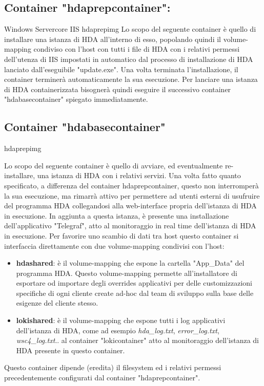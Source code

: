 \subsection{Container "hdaprepcontainer":}

\begin{namespacedesc}
	 {Windows Servercore IIS}
	 {hdaprepimg}
	 {Lo scopo del seguente container è quello di installare una istanza di HDA all'interno di esso, popolando quindi il volume-mapping condiviso con l'host con tutti i file di HDA con i relativi permessi dell'utenza di IIS impostati in automatico dal processo di installazione di HDA lanciato dall'eseguibile "update.exe".
Una volta terminata l'installazione, il container terminerà automaticamente la sua esecuzione. Per lanciare una istanza di HDA containerizzata bisognerà quindi eseguire il successivo container "hdabasecontainer" spiegato immediatamente.}
\end{namespacedesc}
\subsection{Container "hdabasecontainer"}

\begin{namespacedesc}
	 {hdaprepimg}
	 {Lo scopo del seguente container è quello di avviare, ed eventualmente re-installare, una istanza di HDA con i relativi servizi. Una volta fatto quanto specificato, a differenza del container hdaprepcontainer, questo non interromperà la sua esecuzione, ma rimarrà attivo per permettere ad utenti esterni di usufruire del programma HDA collegandosi alla web-interface propria dell'istanza di HDA in esecuzione. In aggiunta a questa istanza, è presente una installazione dell'applicativo "Telegraf", atto al monitoraggio in real time dell'istanza di HDA in esecuzione. 
Per favorire uno scambio di dati tra host questo container si interfaccia direttamente con due volume-mapping condivisi con l'host:
\begin{itemize}
	\item \textbf{hdashared}: è il volume-mapping che espone la cartella "App\_Data" del programma HDA. Questo volume-mapping permette all'installatore di esportare od importare degli overrides applicativi per delle customizzazioni specifiche di ogni cliente create ad-hoc dal team di sviluppo sulla base delle esigenze del cliente stesso.
	\item \textbf{lokishared}: è il volume-mapping che espone tutti i log applicativi dell'istanza di HDA, come ad esempio \textit{hda\_log.txt}, \textit{error\_log.txt}, \textit{wsc4\_log.txt}.. al container "lokicontainer" atto al monitoraggio dell'istanza di HDA presente in questo container.
\end{itemize}
Questo container dipende (eredita) il filesystem  ed i relativi permessi precedentemente configurati dal container "hdaprepcontainer".}
\end{namespacedesc}

